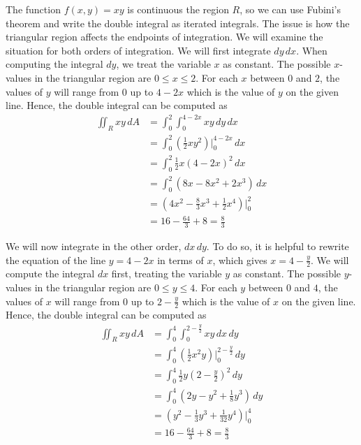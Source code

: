 \documentclass[handout]{ximera}
\begin{document}
\begin{example}[Example 1]
The function $f(x,y) = xy$ is continuous the region $R$, so we can use Fubini's theorem and write the double integral as iterated integrals.
The issue is how the triangular region affects the endpoints of integration. We will examine the situation for both orders of integration.
We will first integrate $dy\, dx$. When computing the integral $dy$, we treat the variable $x$ as constant. 
The possible $x$-values in the triangular region are $0 \leq x \leq 2$.  
For each $x$ between $0$ and $2$, the values of $y$ will range from $0$ up to $4 - 2x$ which is the value of $y$ on the given line.
Hence, the double integral can be computed as
\begin{align*}
\iint_R xy \, dA & = \int_0^2 \int_0^{4 - 2x} xy \, dy \, dx\\
                 & = \int_0^2 \left(\frac12 xy^2 \right) \bigg|_{0}^{4 - 2x} \, dx\\
                 & = \int_0^2 \frac12 x (4-2x)^2 \, dx\\
                 &=  \int_0^2 \left(8x - 8x^2 + 2x^3\right) \, dx\\
                 &= \left(4x^2 - \frac83 x^3 + \frac12 x^4 \right) \bigg|_0^2\\
                 &= 16 - \frac{64}{3} + 8 = \frac83
\end{align*}      
\begin{image}
\end{image}
We will now integrate in the other order, $dx \, dy$. To do so, it is helpful to rewrite the equation of the line $y = 4 - 2x$ in terms of $x$, which gives
$x = 4 - \frac{y}{2}$. 
We will compute the integral $dx$ first, treating the variable $y$ as constant. 
The possible $y$-values in the triangular region are $0 \leq y \leq 4$.  
For each $y$ between $0$ and $4$, the values of $x$ will range from $0$ up to $2 - \frac{y}{2}$ which is the value of $x$ on the given line.
Hence, the double integral can be computed as
\begin{align*}
\iint_R xy \, dA & = \int_0^4 \int_0^{2 - \frac{y}{2}} xy \, dx \, dy\\
                 & = \int_0^4 \left(\frac12 x^2y \right) \bigg|_{0}^{2 - \frac{y}{2}} \, dy\\
                 & = \int_0^4 \frac12 y \left(2 - \frac{y}{2}\right)^2 \, dy\\
                 &= \int_0^4 \left(2y - y^2 + \frac18 y^3\right) \, dy\\
                 &= \left(y^2 - \frac13 y^3 + \frac{1}{32} y^4 \right) \bigg|_0^4\\
                 &= 16 - \frac{64}{3} + 8 = \frac83
\end{align*}      


\end{example}
\end{document}
